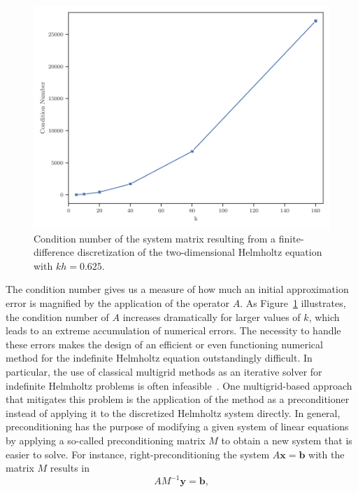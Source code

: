 \begin{figure}
		\includegraphics[scale=0.725]{figures/cond.pdf}
		\caption[Condition number resulting from a finite-difference discretization of the two-dimensional Helmholtz equation]{Condition number of the system matrix resulting from a finite-difference discretization of the two-dimensional Helmholtz equation with $kh = 0.625$.}
		\label{fig:condition-number-helmholtz}
\end{figure}
The condition number gives us a measure of how much an initial approximation error is magnified by the application of the operator $A$.
As Figure~\ref{fig:condition-number-helmholtz} illustrates, the condition number of $A$ increases dramatically for larger values of $k$, which leads to an extreme accumulation of numerical errors. 
The necessity to handle these errors makes the design of an efficient or even functioning numerical method for the indefinite Helmholtz equation outstandingly difficult.
In particular, the use of classical multigrid methods as an iterative solver for indefinite Helmholtz problems is often infeasible~\cite{ernst2012difficult}.
One multigrid-based approach that mitigates this problem is the application of the method as a preconditioner instead of applying it to the discretized Helmholtz system directly.
In general, preconditioning has the purpose of modifying a given system of linear equations by applying a so-called preconditioning matrix $M$ to obtain a new system that is easier to solve.
For instance, right-preconditioning the system $A \bm{x} = \bm{b}$ with the matrix $M$ results in
\begin{equation}
	A M^{-1} \bm{y} = \bm{b},
	\label{eq:right-preconditioning}
\end{equation}
